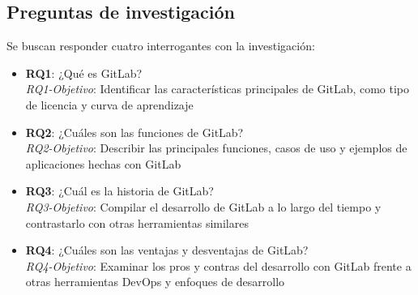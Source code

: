 \documentclass[runningheads]{llncs}
\begin{document}
\subsection{Preguntas de investigación}
Se buscan responder cuatro interrogantes con la investigación:
\begin{itemize}
        \item \textbf{RQ1}: ¿Qué es GitLab?\\
        \textit{RQ1-Objetivo}: Identificar las características principales de GitLab, como tipo de licencia y curva de aprendizaje
        \item \textbf{RQ2}: ¿Cuáles son las funciones de GitLab?\\
        \textit{RQ2-Objetivo}: Describir las principales funciones, casos de uso y ejemplos de aplicaciones hechas con GitLab
        \item \textbf{RQ3}: ¿Cuál es la historia de GitLab?\\
        \textit{RQ3-Objetivo}: Compilar el desarrollo de GitLab a lo largo del tiempo y contrastarlo con otras herramientas similares
        \item \textbf{RQ4}: ¿Cuáles son las ventajas y desventajas de GitLab?\\
        \textit{RQ4-Objetivo}: Examinar los pros y contras del desarrollo con GitLab frente a otras herramientas DevOps y enfoques de desarrollo
\end{itemize}
\end{document}
